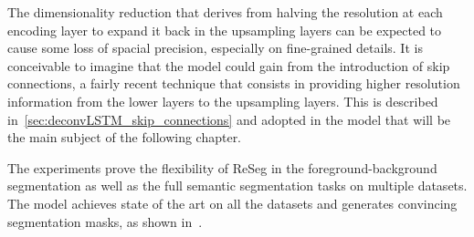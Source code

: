 The dimensionality reduction that derives from halving the resolution at each
encoding layer to expand it back in the upsampling layers can be expected to
cause some loss of spacial precision, especially on fine-grained details. It is
conceivable to imagine that the model could gain from the introduction of skip
connections, a fairly recent technique that consists in providing higher
resolution information from the lower layers to the upsampling layers. This is
described in~\autoref{sec:deconvLSTM_skip_connections} and adopted in the model
that will be the main subject of the following chapter.

The experiments prove the flexibility of ReSeg in the foreground-background
segmentation as well as the full semantic segmentation tasks on multiple
datasets. The model achieves state of the art on all the datasets and generates
convincing segmentation masks, as shown in~.
